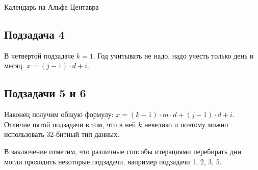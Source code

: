 \begin{tutorial}{Календарь на Альфе Центавра}
\subsection*{Подзадача 4}
В четвертой подзадаче $k = 1$. Год учитывать не надо, надо учесть только день и месяц. $x = (j - 1) \cdot d + i$.

\subsection*{Подзадачи 5 и 6}
Наконец получим общую формулу: $x = (k - 1) \cdot m \cdot d + (j - 1) \cdot d + i$. Отличие пятой подзадачи в том, что в ней $k$ невелико и поэтому можно использовать 32-битный тип данных.

В заключение отметим, что различные способы итерациями перебирать дни могли проходить некоторые подзадачи, например подзадачи 1, 2, 3, 5.



\end{tutorial}
